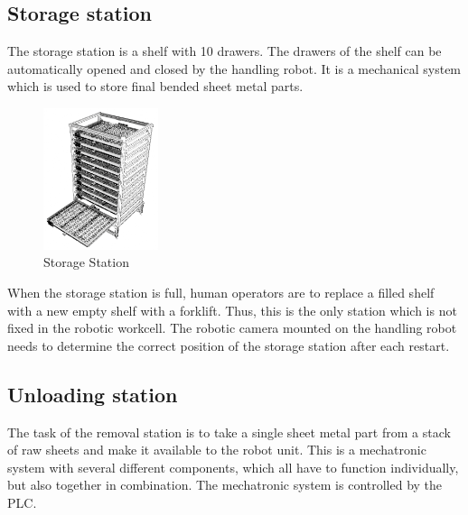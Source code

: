 \subsection{Storage station}
\label{sub:storage-station}
The storage station is a shelf with 10 drawers. The drawers of the shelf can be automatically opened and closed by the
handling robot. It is a mechanical system which is used to store final bended sheet metal parts.

\begin{figure}[h]
    \centering
    \includegraphics[width=0.3\textwidth]{figures/storage-station-blender.png}
    \caption{Storage Station}
    \label{fig:storage-station}
\end{figure}

When the storage station is full, human operators are to replace a filled shelf with a new empty shelf with a forklift. Thus, this is the only station
which is not fixed in the robotic workcell. The robotic camera mounted on the handling robot needs to determine the correct position of the storage station
after each restart.

\subsection{Unloading station}
\label{sub:unloading-station}
    The task of the removal station is to take a single sheet metal part from a stack of raw sheets and make it
    available to the robot unit. This is a mechatronic system with several different components, which all
    have to function individually, but also together in combination. The mechatronic system is controlled by the PLC.


